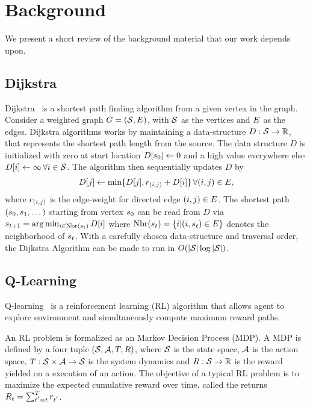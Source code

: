 \section{Background}

We present a short review of the background material that our work depends upon.

\subsection{Dijkstra}
\newcommand{\vertices}{\State}
\newcommand{\edge}{\rew}
\newcommand{\fwds}{D}
\newcommand{\dds}{D}
Dijkstra~\citep{dijkstra1959note} is a shortest path finding algorithm from a
given vertex in the graph. Consider a weighted graph $G = (\vertices,
\edges)$, with $\vertices$ as the vertices and $E$ as the edges. Dijkstra
algorithms works by maintaining a data-structure $\dds : \vertices \rightarrow
\R$, that represents the shortest path length from the source. The data
structure $\dds$ is initialized with zero at start location $\dds[\state_0]
\leftarrow 0$ and a high value everywhere else $\dds[i] \leftarrow \infty \, \forall
i \in \vertices$. The algorithm then sequentially updates $\dds$ by
%
\begin{align}
  \dds[j] \leftarrow \min\{\dds[j], \edge_{(i, j)} + \dds[i] \} \, \forall (i, j) \in \edges ,
  \label{eq:dijkstra}
\end{align}%
%
where $\edge_{(i, j)}$ is the edge-weight for directed edge $(i, j) \in E$.
The shortest path $(s_0, s_{1}, \dots)$ starting from vertex
$s_0$ can be read from $\dds$ via $\state_{t+1} = \arg \min_{i \in
\text{Nbr}(\state_t)} \dds[i]$ where $\text{Nbr}(s_t) = \{ i | (i,
s_t) \in E \} $ denotes the neighborhood of $s_t$. With a
carefully chosen data-structure and traversal order, the Dijkstra Algorithm can
be made to run in $O(|\vertices|\log|\vertices|)$.

\subsection{Q-Learning}
Q-learning~\citep{watkins1992qlearning} is a reinforcement learning (RL)
algorithm that allows agent to explore environment and simultaneously
compute maximum reward paths.

An RL problem is formalized as an Markov Decision Process (MDP). A MDP is
defined by a four tuple $(\mathcal{S}, \mathcal{A}, T, R)$, where $\mathcal{S}$ is the
state space, $\mathcal{A}$ is the action space, $T : \mathcal{S} \times \mathcal{A}
\rightarrow \mathcal{S}$ is the system dynamics and $R : \mathcal{S}
\rightarrow \mathbb{R} $ is the reward yielded on a execution of an action.
The objective of a typical RL problem is to maximize the expected cumulative
reward over time, called the returns  $ R_t = \sum_{t^{'}=t}^{T} r_{t^{'}}$.

